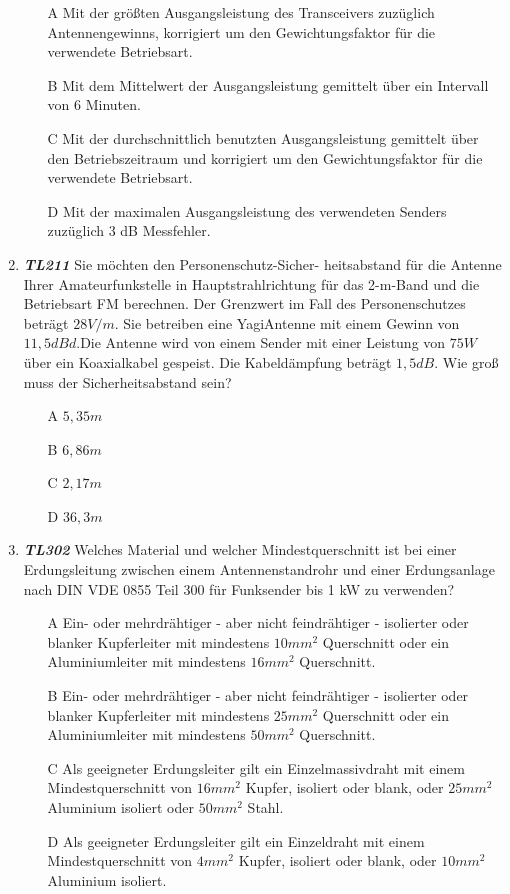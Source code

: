 \begin{enumerate}
\begin{enumerate}
	\itemsep1pt\parskip0pt
		\item[A] Mit der größten Ausgangsleistung des Transceivers zuzüglich Antennengewinns, korrigiert um den Gewichtungsfaktor für die verwendete Betriebsart.
		\item[B] Mit dem Mittelwert der Ausgangsleistung gemittelt über ein Intervall von 6 Minuten.
		\item[C]  Mit der durchschnittlich benutzten Ausgangsleistung gemittelt über den Betriebszeitraum und korrigiert um den Gewichtungsfaktor für die verwendete Betriebsart.
		\item[D]  Mit der maximalen Ausgangsleistung des verwendeten Senders zuzüglich 3 dB Messfehler.
		\end{enumerate}	
	\item \emph{\textbf{TL211}} Sie möchten den Personenschutz-Sicher-
heitsabstand für die Antenne Ihrer Amateurfunkstelle in Hauptstrahlrichtung für das 2-m-Band und die Betriebsart FM berechnen. Der Grenzwert im Fall des Personenschutzes beträgt $28 V/m$. Sie betreiben eine YagiAntenne mit einem Gewinn von $11,5 dBd$.Die Antenne wird von einem Sender mit einer Leistung von $75W$ über ein Koaxialkabel gespeist. Die Kabeldämpfung beträgt $1,5 dB$. Wie groß muss der Sicherheitsabstand sein?
	\begin{enumerate}
	\itemsep1pt\parskip0pt
		\item[A] $5,35m$
		\item[B] $6,86m$
		\item[C] $2,17m$
		\item[D] $36,3m$
		\end{enumerate}
	\item \emph{\textbf{TL302}} Welches Material und welcher Mindestquerschnitt ist bei einer Erdungsleitung zwischen einem Antennenstandrohr und einer Erdungsanlage nach DIN VDE 0855 Teil 300 für Funksender bis 1 kW zu verwenden?
	\begin{enumerate}
	\itemsep1pt\parskip0pt
		\item[A] Ein- oder mehrdrähtiger - aber nicht feindrähtiger - isolierter oder blanker Kupferleiter mit mindestens $10 mm^2$ Querschnitt oder ein Aluminiumleiter mit mindestens $16 mm^2$ Querschnitt.
		\item[B] Ein- oder mehrdrähtiger - aber nicht feindrähtiger - isolierter oder blanker Kupferleiter mit mindestens $25 mm^2$ Querschnitt oder ein Aluminiumleiter mit mindestens $50 mm^2$ Querschnitt.
		\item[C]  Als geeigneter Erdungsleiter gilt ein Einzelmassivdraht mit einem Mindestquerschnitt von $16 mm^2$ Kupfer, isoliert oder blank, oder $25 mm^2$ Aluminium isoliert oder $50 mm^2$ Stahl.
		\item[D] Als geeigneter Erdungsleiter gilt ein Einzeldraht mit einem Mindestquerschnitt von $4 mm^2$ Kupfer, isoliert oder blank, oder $10 mm^2$ Aluminium isoliert.
		\end{enumerate}
\end{enumerate}



